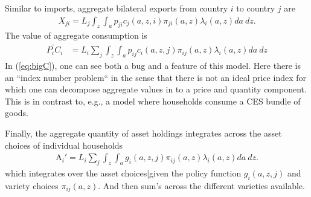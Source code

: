 \documentclass[12pt,pdftex]{article}
\begin{document}
\begin{onehalfspacing}
Similar to imports, aggregate bilateral exports from country $i$ to country $j$ are
\begin{align}
X_{ji} = L_j \int_{z} \int_{a}  p_{ji} c_{j}(a, z, i) \pi_{ji}(a, z) \lambda_i(a, z)da \ dz.
\label{eq:exports}
\end{align}
The value of aggregate consumption is
\begin{align}
\widetilde{P_{i} C_i}  &=  L_{i} \sum_{j} \int_{z} \int_{a}  p_{ij} c_{i}(a, z, j) \pi_{ij}(a, z) \lambda_i(a, z)da \ dz \label{eq:bigC}
\end{align}
In (\ref{eq:bigC}), one can see both a bug and a feature of this model. Here there is an ``index number problem`` in the sense that there is not an ideal price index for which one can decompose aggregate values in to a price and quantity component. This is in contrast to, e.g., a model where households consume a CES bundle of goods.

Finally, the aggregate quantity of asset holdings integrates across the asset choices of individual households
\begin{align}
\mathrm{A}_i' = L_{i}\sum_{j} \int_{z} \int_{a}  g_{i}(a, z, j) \pi_{ij}(a, z) \lambda_i(a, z) da \ dz.
\label{eq:aggregate_asset}
\end{align}
which integrates over the asset choices|given the policy function $g_{i}(a, z, j)$ and variety choices $\pi_{ij}(a, z)$. And then sum's across the different varieties available.


\end{onehalfspacing}
\end{document}
